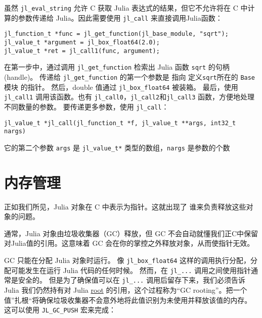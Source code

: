 虽然 \texttt{jl\_eval\_string} 允许 C 获取 Julia 表达式的结果，但它不允许将在 C 中计算的参数传递给 Julia。因此需要使用 \texttt{jl\_call} 来直接调用Julia函数：




\begin{lstlisting}
jl_function_t *func = jl_get_function(jl_base_module, "sqrt");
jl_value_t *argument = jl_box_float64(2.0);
jl_value_t *ret = jl_call1(func, argument);
\end{lstlisting}



在第一步中，通过调用 \texttt{jl\_get\_function} 检索出 Julia 函数 \texttt{sqrt} 的句柄(handle)。 传递给 \texttt{jl\_get\_function} 的第一个参数是 指向 定义\texttt{sqrt}所在的 \texttt{Base} 模块 的指针。 然后，double 值通过 \texttt{jl\_box\_float64} 被装箱。 最后，使用 \texttt{jl\_call1} 调用该函数。也有 \texttt{jl\_call0}，\texttt{jl\_call2}和\texttt{jl\_call3} 函数，方便地处理不同数量的参数。 要传递更多参数，使用 \texttt{jl\_call}：




\begin{lstlisting}
jl_value_t *jl_call(jl_function_t *f, jl_value_t **args, int32_t nargs)
\end{lstlisting}



它的第二个参数 \texttt{args} 是 \texttt{jl\_value\_t*} 类型的数组，\texttt{nargs} 是参数的个数



\hypertarget{3779983102705119396}{}


\section{内存管理}



正如我们所见，Julia 对象在 C 中表示为指针。这就出现了 谁来负责释放这些对象的问题。



通常，Julia 对象由垃圾收集器（GC）释放，但 GC 不会自动就懂我们正C中保留对Julia值的引用。这意味着 GC 会在你的掌控之外释放对象，从而使指针无效。



GC 只能在分配 Julia 对象时运行。 像 \texttt{jl\_box\_float64} 这样的调用执行分配，分配可能发生在运行 Julia 代码的任何时候。 然而，在 \texttt{jl\_...} 调用之间使用指针通常是安全的。 但是为了确保值可以在 \texttt{jl\_...} 调用后留存下来，我们必须告诉 Julia 我们仍然持有对 Julia \href{https://www.cs.purdue.edu/homes/hosking/690M/p611-fenichel.pdf}{root} 的引用，这个过程称为“GC rooting”。把一个值”扎根“将确保垃圾收集器不会意外地将此值识别为未使用并释放该值的内存。 这可以使用 \texttt{JL\_GC\_PUSH} 宏来完成：




